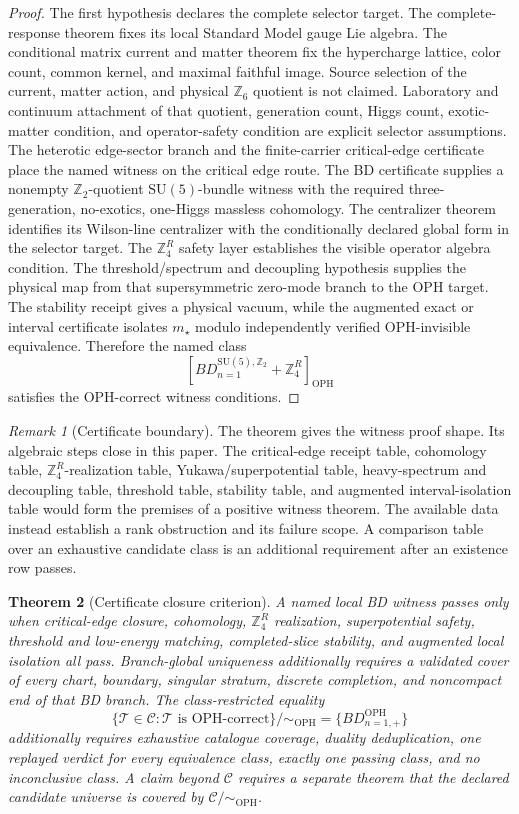 \documentclass[11pt]{article}
\newtheorem{theorem}{Theorem}[section]
\theoremstyle{remark}
\newtheorem{remark}[theorem]{Remark}
\theoremstyle{plain}
\newcommand{\OPH}{\mathrm{OPH}}
\newcommand{\SU}{\mathrm{SU}}
\newcommand{\Z}{\mathbb Z}
\newcommand{\ZfourR}{\mathbb Z_4^R}
\newcommand{\Teq}{\sim_{\OPH}}
\begin{document}
\begin{proof}
The first hypothesis declares the complete selector target. The
complete-response theorem fixes its local Standard Model gauge Lie algebra. The conditional matrix
current and matter theorem fix the hypercharge lattice, color count, common
kernel, and maximal faithful image. Source selection of the current, matter
action, and physical \(\Z_6\) quotient is not claimed. Laboratory and
continuum attachment of that quotient, generation count, Higgs count,
exotic-matter condition, and operator-safety condition are explicit
selector assumptions. The heterotic edge-sector branch
and the finite-carrier critical-edge certificate place the named witness on the critical edge
route. The BD certificate supplies a nonempty \(\Z_2\)-quotient \(\SU(5)\)-bundle witness with the
required three-generation, no-exotics, one-Higgs massless cohomology. The
centralizer theorem identifies its Wilson-line centralizer with the
conditionally declared global form in the selector target. The
\(\ZfourR\) safety
layer establishes the visible operator algebra condition. The threshold/spectrum and decoupling hypothesis
supplies the physical map from that supersymmetric zero-mode branch to the OPH target. The
stability receipt gives a physical vacuum, while the augmented exact or interval certificate
isolates \(m_\star\) modulo independently verified OPH-invisible equivalence. Therefore the named class
\[
\left[
BD_{n=1}^{\SU(5),\Z_2}+\ZfourR
\right]_{\OPH}
\]
satisfies the OPH-correct witness conditions.
\end{proof}

\begin{remark}[Certificate boundary]
The theorem gives the witness proof shape. Its algebraic steps close in this paper. The critical-edge
receipt table, cohomology table, \(\ZfourR\)-realization table, Yukawa/superpotential table,
heavy-spectrum and decoupling table, threshold table, stability table, and augmented interval-isolation table would
form the premises of a positive witness theorem. The available data instead establish a rank
obstruction and its failure scope. A
comparison table over an exhaustive
candidate class is an additional requirement after an existence row passes.
\end{remark}

\begin{theorem}[Certificate closure criterion]
A named local BD witness passes only when critical-edge closure, cohomology, \(\ZfourR\)
realization, superpotential safety, threshold and low-energy matching, completed-slice stability,
and augmented local isolation all pass. Branch-global uniqueness additionally requires a validated
cover of every chart, boundary, singular stratum, discrete completion, and noncompact end of that
BD branch. The class-restricted equality
\[
\{\mathcal T\in\mathcal C:\mathcal T\text{ is OPH-correct}\}/\Teq=\{BD_{n=1,+}^{\OPH}\}
\]
additionally requires exhaustive catalogue coverage, duality deduplication, one replayed verdict
for every equivalence class, exactly one passing class, and no inconclusive class. A claim beyond
\(\mathcal C\) requires a separate theorem that the declared candidate universe is covered by
\(\mathcal C/\Teq\).
\end{theorem}
\end{document}
